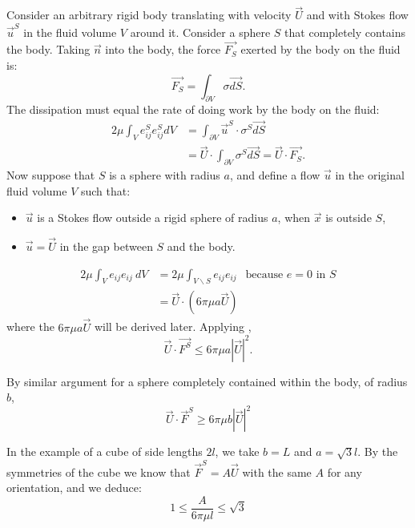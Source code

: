 \documentclass[../Main.tex]{subfiles}
\begin{document}
\begin{example}
    Consider an arbitrary rigid body translating with velocity $\vec{U}$ and with Stokes flow $\vec{u}^S$ in the fluid volume $V$ around it. Consider a sphere $S$ that completely contains the body. Taking $\vec{n}$ into the body, the force $\vec{F_S}$ exerted by the body on the fluid is:
    \begin{equation*}
        \vec{F_S} = \int_{\partial V} \sigma\vec{dS}.
    \end{equation*}
    The dissipation must equal the rate of doing work by the body on the fluid:
    \begin{align*}
        2\mu \int_{V} e^S_{ij} e^S_{ij} dV &= \int_{\partial V} \vec{u}^S \cdot \sigma^S \vec{dS} \\
        &= \vec{U} \cdot \int_{\partial V} \sigma^S \vec{dS} = \vec{U} \cdot \vec{F_S}.
    \end{align*}
    Now suppose that $S$ is a sphere with radius $a$, and define a flow $\vec{u}$ in the original fluid volume $V$ such that:
    \begin{itemize}
        \item $\vec{u}$ is a Stokes flow outside a rigid sphere of radius $a$, when $\vec{x}$ is outside $S$,
        \item $\vec{u} = \vec{U}$ in the gap between $S$ and the body.
    \end{itemize}
    \begin{align*}
        2\mu \int_V e_{ij} e_{ij}~dV &= 2\mu \int_{V \backslash S} e_{ij} e_{ij}~~\text{ because $e = 0$ in $S$} \\
        &= \vec{U} \cdot \left(6\pi \mu a \vec{U}\right)
    \end{align*}
    where the $6\pi \mu a \vec{U}$ will be derived later. Applying ,
    \begin{equation*}
        \vec{U} \cdot \vec{F^S} \leq 6\pi \mu a |\vec{U}|^2.
    \end{equation*}

    By similar argument for a sphere completely contained within the body, of radius $b$,
    \begin{equation*}
        \vec{U} \cdot \vec{F}^S \geq 6\pi \mu b |\vec{U}|^2
    \end{equation*}

    In the example of a cube of side lengths $2l$, we take $b = L$ and $a = \sqrt{3}l$. By the symmetries of the cube we know that $\vec{F}^S = A\vec{U}$ with the same $A$ for any orientation, and we deduce:
    \begin{equation*}
        1 \leq \frac{A}{6\pi \mu l} \leq \sqrt{3}
    \end{equation*}
\end{example}
\end{document}
